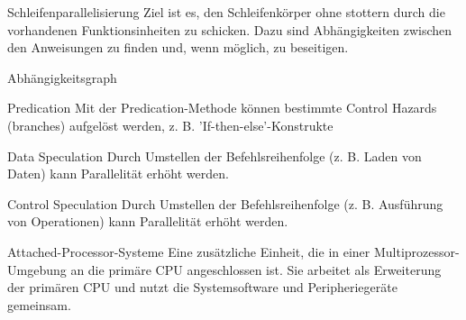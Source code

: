 \begin{defi}{Schleifenparallelisierung}
    Ziel ist es, 
    den Schleifenkörper ohne stottern durch die vorhandenen Funktionsinheiten zu schicken.
    Dazu sind Abhängigkeiten zwischen den Anweisungen zu finden und, 
    wenn möglich, zu beseitigen.
\end{defi}

\begin{defi}{Abhängigkeitsgraph}
    
\end{defi}

\begin{defi}{Predication}
    Mit der Predication-Methode können bestimmte Control Hazards (branches) aufgelöst werden, 
    z. B. 'If-then-else'-Konstrukte
\end{defi}

\begin{defi}{Data Speculation}
    Durch Umstellen der Befehlsreihenfolge (z. B. Laden von Daten) kann Parallelität erhöht werden.
\end{defi}

\begin{defi}{Control Speculation}
    Durch Umstellen der Befehlsreihenfolge (z. B. Ausführung von Operationen) kann Parallelität erhöht werden.
\end{defi}

\begin{defi}{Attached-Processor-Systeme}
    Eine zusätzliche Einheit, 
    die in einer Multiprozessor-Umgebung an die primäre CPU angeschlossen ist. 
    Sie arbeitet als Erweiterung der primären CPU und 
    nutzt die Systemsoftware und Peripheriegeräte gemeinsam.
\end{defi}